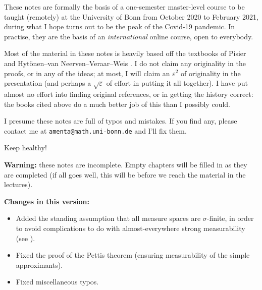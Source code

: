 These notes are formally the basis of a one-semester master-level course to be taught (remotely) at the University of Bonn from October 2020 to February 2021, during what I hope turns out to be the peak of the Covid-19 pandemic.
In practise, they are the basis of an \emph{international} online course, open to everybody.

Most of the material in these notes is heavily based off the textbooks of Pisier \cite{gP16} and Hyt\"onen--van Neerven--Veraar--Weis \cite{HNVW16, HNVW17}.
I do not claim any originality in the proofs, or in any of the ideas; at most, I will claim an $\varepsilon^2$ of originality in the presentation (and perhaps a $\sqrt{\varepsilon}$ of effort in putting it all together).
I have put almost no effort into finding original references, or in getting the history correct: the books cited above do a much better job of this than I possibly could.

\vspace{1cm}

I presume these notes are full of typos and mistakes.
If you find any, please contact me at \texttt{amenta@math.uni-bonn.de} and I'll fix them.

\vspace{1cm}

Keep healthy! 




\vspace{2cm}

\textbf{Warning:} these notes are incomplete.
Empty chapters will be filled in as they are completed (if all goes well, this will be before we reach the material in the lectures).

\textbf{Changes in this version:}
\begin{itemize}
\item Added the standing assumption that all measure spaces are $\sigma$-finite, in order to avoid complications to do with almost-everywhere strong measurability (see \cite[Section 1.1.b]{HNVW16}).
\item Fixed the proof of the Pettis theorem (ensuring measurability of the simple approximants).
\item Fixed miscellaneous typos.
\end{itemize}





